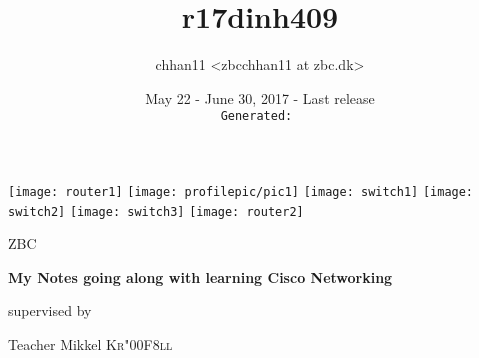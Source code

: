 
\title{r17dinh409}
\def\thesubject{My Notes going along with learning Cisco Networking}
\def\theinstitution{ZBC}

\author{chhan11 <zbcchhan11 at zbc.dk>}
\def\thesupervisor{Teacher Mikkel \textsc{Kr\char"00F8ll}}

\date{May 22 - June 30, 2017 - Last release \theversion\\%
    {\tiny\texttt{\color{GreenYellow}Generated: \utccurrenttime}}}


\def\theversion{v0.3.0}

\begin{titlepage}
    \centering
    \texttt{[image: router1]}
    \texttt{[image: profilepic/pic1]}
    \texttt{[image: switch1]}
    \texttt{[image: switch2]}
    \texttt{[image: switch3]}
    \texttt{[image: router2]}\par\vspace{1cm}
    {\scshape\LARGE \theinstitution\par}
    \vspace{1cm}
    {\scshape\Large \thetitle\par}
    \vspace{1.5cm}
    {\huge\bfseries \thesubject\par}
    \vspace{2cm}
    {\Large\itshape \theauthor\par}
    \vfill
    supervised by\par
    \thesupervisor
    
    \vfill
    
    {\large \thedate\par}
\end{titlepage}
